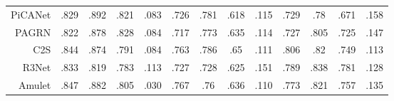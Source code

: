 \begin{table}[!ht]
{\begin{tabular}{rcccccccccccc}
			PiCANet \cite{liu2018picanet}
			& .829 & .892 & .821 & .083 
			& .726 & .781 & .618 & .115 
			& .729 & .78  & .671 & .158 \\
			
			PAGRN \cite{wang2018detect}
			& .822 & .878 & .828 & .084 
			& .717 & .773 & .635 & .114 
			& .727 & .805 & .725 & .147 \\
			
			C2S   \cite{li2018contour}
			& .844 & .874 & .791 & .084 
			& .763 & .786 & .65  & .111 
			& .806 & .82  & .749 & .113 \\
			
			R3Net  \cite{deng2018r3net}
			& .833 & .819 & .783 & .113 
			& .727 & .728 & .625 & .151 
			& .789 & .838 & .781 & .128 \\
			
			Amulet \cite{zhang2017amulet}
			& .847 & .882 & .805 & .030 
			& .767 & .76  & .636 & .110  
			& .773 & .821 & .757 & .135 \\
			
			
			\bottomrule[2pt] %
		\end{tabular}
	}
\end{table}



